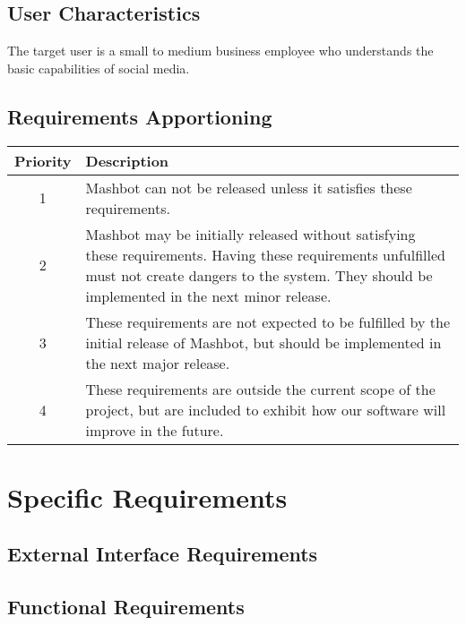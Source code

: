 \documentclass{article}
\begin{document}
	\subsection{User Characteristics}
        The target user is a small to medium business employee who understands
        the basic capabilities of social media.
        
	\subsection{Requirements Apportioning}
        \begin{tabular}{|c|p{4in}|}
          \hline
          \textbf{Priority} & \textbf{Description} \\
          \hline \hline
          1 & Mashbot can not be released unless it satisfies these
              requirements. \\
          \hline
          2 & Mashbot may be initially released without satisfying these
              requirements. Having these requirements unfulfilled must
              not create dangers to the system. They should be implemented in the next
              minor release. \\
          \hline
          3 & These requirements are not expected to be fulfilled by
              the initial release of Mashbot, but should be
              implemented in the next major release. \\
          \hline
          4 & These requirements are outside the current scope of the
              project, but are included to exhibit how our software
              will improve in the future. \\
          \hline
        \end{tabular}

\section{Specific Requirements}
	\subsection{External Interface Requirements}
	\subsection{Functional Requirements}
\end{document}
